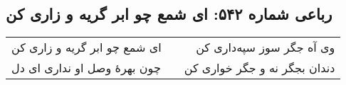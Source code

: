 \begin{center}
\section*{رباعی شماره ۵۴۲: ای شمع چو ابر گریه و زاری کن}
\label{sec:sh542}
\begin{longtable}{l p{0.5cm} r}
ای شمع چو ابر گریه و زاری کن
&&
وی آه جگر سوز سپه‌داری کن
\\
چون بهرهٔ وصل او نداری ای دل
&&
دندان بجگر نه و جگر خواری کن
\\
\end{longtable}
\end{center}
